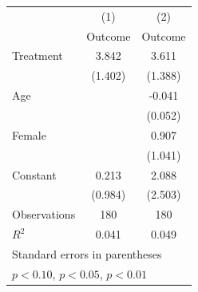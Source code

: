 \begin{tabular}{l*{2}{c}}
\toprule
                    &\multicolumn{1}{c}{(1)}&\multicolumn{1}{c}{(2)}\\
                    &\multicolumn{1}{c}{Outcome}&\multicolumn{1}{c}{Outcome}\\
\midrule
Treatment           &       3.842\sym{**} &       3.611\sym{**} \\
                    &     (1.402)         &     (1.388)         \\
Age                 &                     &      -0.041         \\
                    &                     &     (0.052)         \\
Female              &                     &       0.907         \\
                    &                     &     (1.041)         \\
Constant            &       0.213         &       2.088         \\
                    &     (0.984)         &     (2.503)         \\
\midrule
Observations        &         180         &         180         \\
\(R^{2}\)           &       0.041         &       0.049         \\
\bottomrule
\multicolumn{3}{l}{\footnotesize Standard errors in parentheses}\\
\multicolumn{3}{l}{\footnotesize \sym{*} \(p<0.10\), \sym{**} \(p<0.05\), \sym{***} \(p<0.01\)}\\
\end{tabular}
